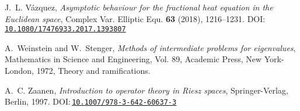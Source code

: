 \documentclass[a4paper, reqno,titlepage]{amsart}
\numberwithin{equation}{section}
\theoremstyle{plain}
\theoremstyle{definition}
\theoremstyle{remark}
\begin{document}
\begin{thebibliography}{10}
J.~L. V\'{a}zquez, \emph{Asymptotic behaviour for the fractional heat equation
  in the {E}uclidean space}, Complex Var. Elliptic Equ. \textbf{63} (2018),
  1216--1231.
  DOI:\,\href{https://doi.org/10.1080/17476933.2017.1393807}{\nolinkurl{10.1080/17476933.2017.1393807}}

A.~Weinstein and W.~Stenger, \emph{Methods of intermediate problems for
  eigenvalues}, Mathematics in Science and Engineering, Vol. 89, Academic
  Press, New York-London, 1972, Theory and ramifications.

A.~C. Zaanen, \emph{Introduction to operator theory in {R}iesz spaces},
  Springer-Verlag, Berlin, 1997.
  DOI:\,\href{https://doi.org/10.1007/978-3-642-60637-3}{\nolinkurl{10.1007/978-3-642-60637-3}}

\end{thebibliography}
\end{document}
